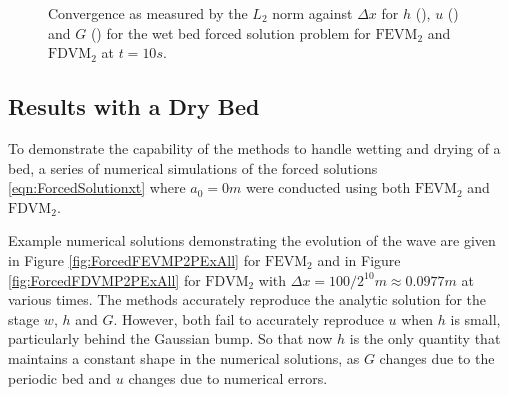 \begin{figure}
\begin{subfigure}{0.5\textwidth}
	\end{subfigure}
	\caption{Convergence as measured by the $L_2$ norm against $\Delta x$ for $h$ (), $u$ () and $G$ () for the wet bed forced solution problem for $\text{FEVM}_2$ and $\text{FDVM}_2$ at $t=10s$.}
	\label{fig:L1convergenceforcedWet}
\end{figure}


\subsection{Results with a Dry Bed} 
To demonstrate the capability of the methods to handle wetting and drying of a bed, a series of numerical simulations of the forced solutions \eqref{eqn:ForcedSolutionxt} where $a_0 = 0m$ were conducted using both $\text{FEVM}_2$ and $\text{FDVM}_2$. 

Example numerical solutions demonstrating the evolution of the wave are given in Figure \ref{fig:ForcedFEVMP2PExAll} for $\text{FEVM}_2$ and in Figure \ref{fig:ForcedFDVMP2PExAll} for $\text{FDVM}_2$ with $\Delta x = 100/ 2^{10} m \approx 0.0977m$ at various times. The methods accurately reproduce the analytic solution for the stage $w$, $h$ and $G$. However, both fail to accurately reproduce $u$ when $h$ is small, particularly behind the Gaussian bump. So that now $h$ is the only quantity that maintains a constant shape in the numerical solutions, as $G$ changes due to the periodic bed and $u$ changes due to numerical errors. 

